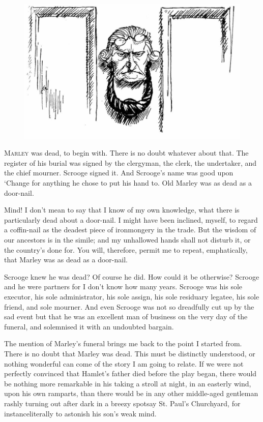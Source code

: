 \documentclass[paper=5.5in:8.5in,BCOR=10mm,twoside,DIV=15,12pt,usegeometry,openany]{scrbook} %
\begin{document}
\renewcommand*{\chaptermarkformat}{}
\begin{figure}[h]
\centering
\includegraphics[width=0.8\linewidth]{knocker}
\end{figure}
\lettrine[loversize=.85]{M}{arley} was dead, to begin with. There is no doubt whatever about that. The register of his burial was signed by the clergyman, the clerk, the undertaker, and the chief mourner. Scrooge signed it. And Scrooge's name was good upon `Change for anything he chose to put his hand to. Old Marley was as dead as a door-nail.

Mind! I don't mean to say that I know of my own knowledge, what there is particularly dead about a door-nail. I might have been inclined, myself, to regard a coffin-nail as the deadest piece of ironmongery in the trade. But the wisdom of our ancestors is in the simile; and my unhallowed hands shall not disturb it, or the country's done for. You will, therefore, permit me to repeat, emphatically, that Marley was as dead as a door-nail.

Scrooge knew he was dead? Of course he did. How could it be otherwise? Scrooge and he were partners for I don't know how many years. Scrooge was his sole executor, his sole administrator, his sole assign, his sole residuary legatee, his sole friend, and sole mourner. And even Scrooge was not so dreadfully cut up by the sad event but that he was an excellent man of business on the very day of the funeral, and solemnised it with an undoubted bargain.

The mention of Marley's funeral brings me back to the point I started from. There is no doubt that Marley was dead. This must be distinctly understood, or nothing wonderful can come of the story I am going to relate. If we were not perfectly convinced that Hamlet's father died before the play began, there would be nothing more remarkable in his taking a stroll at night, in an easterly wind, upon his own ramparts, than there would be in any other middle-aged gentleman rashly turning out after dark in a breezy spot\textemdash say St. Paul's Churchyard, for instance\textemdash literally to astonish his son's weak mind.
\end{document}
